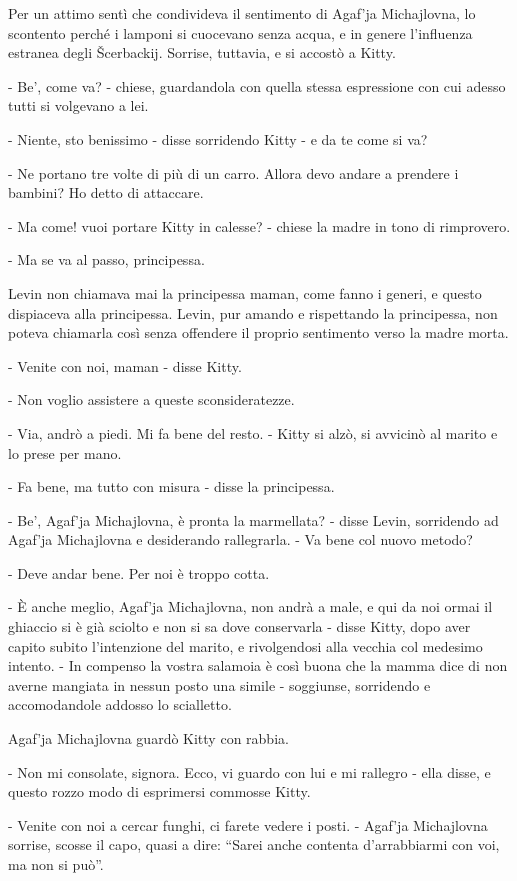 Per un attimo sentì che condivideva il sentimento di Agaf'ja Michajlovna, lo scontento perché i lamponi si cuocevano senza acqua, e in genere l'influenza estranea degli Šcerbackij. Sorrise, tuttavia, e si accostò a Kitty. 

- Be', come va? - chiese, guardandola con quella stessa espressione con cui adesso tutti si volgevano a lei. 

- Niente, sto benissimo - disse sorridendo Kitty - e da te come si va? 

- Ne portano tre volte di più di un carro. Allora devo andare a prendere i bambini? Ho detto di attaccare. 

- Ma come! vuoi portare Kitty in calesse? - chiese la madre in tono di rimprovero. 

- Ma se va al passo, principessa. 

Levin non chiamava mai la principessa maman, come fanno i generi, e questo dispiaceva alla principessa. Levin, pur amando e rispettando la principessa, non poteva chiamarla così senza offendere il proprio sentimento verso la madre morta. 

- Venite con noi, maman - disse Kitty. 

- Non voglio assistere a queste sconsideratezze. 

- Via, andrò a piedi. Mi fa bene del resto. - Kitty si alzò, si avvicinò al marito e lo prese per mano. 

- Fa bene, ma tutto con misura - disse la principessa. 

- Be', Agaf'ja Michajlovna, è pronta la marmellata? - disse Levin, sorridendo ad Agaf'ja Michajlovna e desiderando rallegrarla. - Va bene col nuovo metodo? 

- Deve andar bene. Per noi è troppo cotta. 

- È anche meglio, Agaf'ja Michajlovna, non andrà a male, e qui da noi ormai il ghiaccio si è già sciolto e non si sa dove conservarla - disse Kitty, dopo aver capito subito l'intenzione del marito, e rivolgendosi alla vecchia col medesimo intento. - In compenso la vostra salamoia è così buona che la mamma dice di non averne mangiata in nessun posto una simile - soggiunse, sorridendo e accomodandole addosso lo scialletto. 

Agaf'ja Michajlovna guardò Kitty con rabbia. 

- Non mi consolate, signora. Ecco, vi guardo con lui e mi rallegro - ella disse, e questo rozzo modo di esprimersi commosse Kitty. 

- Venite con noi a cercar funghi, ci farete vedere i posti. - Agaf'ja Michajlovna sorrise, scosse il capo, quasi a dire: ``Sarei anche contenta d'arrabbiarmi con voi, ma non si può''. 

